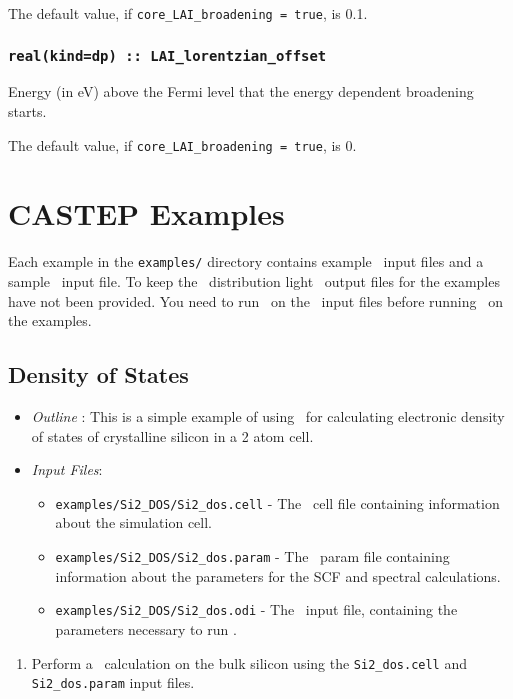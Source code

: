 \documentclass[a4paper,11pt,twoside]{book}
\begin{document}
{The default value, if \verb#core_LAI_broadening = true#, is 0.1.

\subsection[core\_lorentzian\_offset]{\tt real(kind=dp) :: LAI\_lorentzian\_offset}
Energy (in eV) above the Fermi level that the energy dependent broadening starts.

The default value, if \verb#core_LAI_broadening = true#, is 0.


\chapter{CASTEP Examples}

Each example in the \verb#examples/# directory contains example \castep\ input files and a sample \optados\ input file. To keep the \optados\ distribution light \castep\ output files for the examples have not been provided. You need to run \castep\ on the \castep\ input files before running \optados\ on the examples.

\section{Density of States}
\begin{itemize}
\item \emph{Outline} : This is a simple example of using \optados\ for calculating electronic density of states of crystalline silicon in a 2 atom cell.
\item \emph{Input Files}:
\begin{itemize}
\item \verb#examples/Si2_DOS/Si2_dos.cell# - The \castep\ cell file containing information about the simulation cell.
\item \verb#examples/Si2_DOS/Si2_dos.param# - The \castep\ param file containing information about the parameters for the SCF and spectral calculations.
\item \verb#examples/Si2_DOS/Si2_dos.odi# - The \optados\ input file, containing the parameters necessary to run \optados.
\end{itemize}
\end{itemize}

\begin{enumerate}
\item Perform a \castep\ calculation on the bulk silicon using the  \verb#Si2_dos.cell#  and \verb#Si2_dos.param# input files.


\end{enumerate}}
\end{document}
